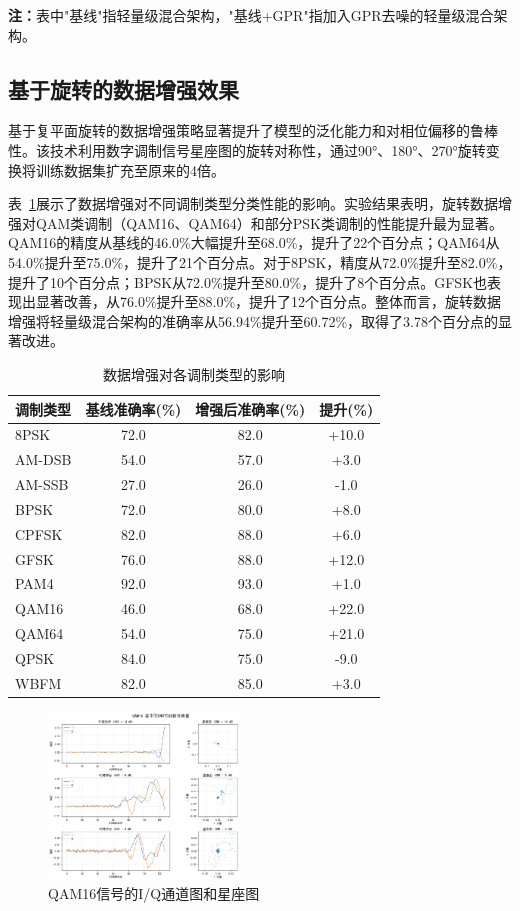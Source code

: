 \documentclass[conference]{IEEEtran}
\begin{document}
\textbf{注：}表中"基线"指轻量级混合架构，"基线+GPR"指加入GPR去噪的轻量级混合架构。

\subsection{基于旋转的数据增强效果}

基于复平面旋转的数据增强策略显著提升了模型的泛化能力和对相位偏移的鲁棒性。该技术利用数字调制信号星座图的旋转对称性，通过90°、180°、270°旋转变换将训练数据集扩充至原来的4倍。

表~\ref{tab:data_augmentation_results}展示了数据增强对不同调制类型分类性能的影响。实验结果表明，旋转数据增强对QAM类调制（QAM16、QAM64）和部分PSK类调制的性能提升最为显著。QAM16的精度从基线的46.0\%大幅提升至68.0\%，提升了22个百分点；QAM64从54.0\%提升至75.0\%，提升了21个百分点。对于8PSK，精度从72.0\%提升至82.0\%，提升了10个百分点；BPSK从72.0\%提升至80.0\%，提升了8个百分点。GFSK也表现出显著改善，从76.0\%提升至88.0\%，提升了12个百分点。整体而言，旋转数据增强将轻量级混合架构的准确率从56.94\%提升至60.72\%，取得了3.78个百分点的显著改进。

\begin{table}[h]
\centering
\caption{数据增强对各调制类型的影响}
\label{tab:data_augmentation_results}
\begin{tabular}{@{}lccc@{}}
\toprule
调制类型 & 基线准确率(\%) & 增强后准确率(\%) & 提升(\%) \\
\midrule
8PSK     & 72.0  & 82.0  & +10.0 \\
AM-DSB   & 54.0  & 57.0  & +3.0  \\
AM-SSB   & 27.0  & 26.0  & -1.0  \\
BPSK     & 72.0  & 80.0  & +8.0  \\
CPFSK    & 82.0  & 88.0  & +6.0  \\
GFSK     & 76.0  & 88.0  & +12.0 \\
PAM4     & 92.0  & 93.0  & +1.0  \\
QAM16    & 46.0  & 68.0  & +22.0 \\
QAM64    & 54.0  & 75.0  & +21.0 \\
QPSK     & 84.0  & 75.0  & -9.0  \\
WBFM     & 82.0  & 85.0  & +3.0  \\
\bottomrule
\end{tabular}
\end{table}

\begin{figure}[htbp]
\centering
\includegraphics[width=0.45\textwidth]{figure/QAM16_rotation.png}
\caption{QAM16信号的I/Q通道图和星座图}
\label{fig:constellation_denoising}
\end{figure}
\end{document}
